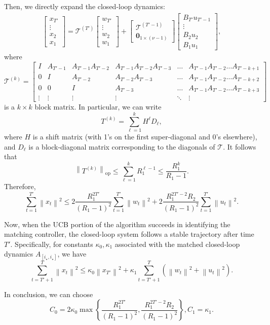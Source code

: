 \documentclass[11pt, twoside]{article}
\theoremstyle{definition}
\newcommand{\norm}[1]{\left\lVert #1 \right\rVert}
\newcommand{\tbo}[2]{\begin{bmatrix}#1 \\ #2\end{bmatrix}}
\newcommand{\opnorm}[1]{\norm{#1}_{\mathrm{op}}}
\begin{document}
Then, we directly expand the closed-loop dynamics:
\begin{align*}
\begin{bmatrix} x_{T'} \\ \vdots \\x_2 \\ x_1 \end{bmatrix}
=
\mathcal{T}^{(T')}
\begin{bmatrix} w_{T'} \\ \vdots \\w_2 \\ w_1  \end{bmatrix}
+
\tbo{\mathcal{T}^{(T'-1)}}{\mathbf{0}_{1 \times (\nu-1)}}
\begin{bmatrix} B_{T'} u_{T'-1} \\ \vdots \\ B_2 u_2 \\ B_1 u_1  \end{bmatrix},
\end{align*}
where
$$\mathcal{T}^{(k)} = 
\begin{bmatrix} 
    I & A_{T'-1} & A_{T'-1}A_{T'-2} & A_{T'-1}A_{T'-2}A_{T'-3} & \dots &A_{T'-1}A_{T'-2} \dots A_{T'-k+1}\\ 
    0 & I & A_{T'-2} & A_{T'-2}A_{T'-3} & \dots & A_{T'-1}A_{T'-2} \dots A_{T'-k+2} \\ 
    0 & 0 & I & A_{T'-3} & \dots & A_{T'-1}A_{T'-2} \dots A_{T'-k+3}\\ 
    \vdots & \vdots & \vdots & \vdots & \ddots & \vdots
\end{bmatrix}$$
is a $k \times k$ block matrix.
In particular, we can write
\[T^{(k)} = \sum_{\ell=1}^k H^\ell D_\ell,\]
where $H$ is a shift matrix (with 1's on the first super-diagonal and 0's elsewhere), and $D_\ell$ is a block-diagonal matrix corresponding to the diagonals of $\mathcal{T}$.
It follows that 
\[\opnorm{T^{(k)}} \le \sum_{\ell=1}^k R_1^{\ell-1} \le \frac{R_1^{k}}{R_1 -1}.\]
Therefore,
\[\sum_{t=1}^{T'} \norm{x_t}^2 \le 2 \frac{R_1^{2T'}}{(R_1-1)^2} \sum_{t=1}^{T'} \norm{w_t}^2 + 2 \frac{R_1^{2T'-2}R_2}{(R_1-1)^2} \sum_{t=1}^{T'} \norm{u_t}^2. \]

Now, when the UCB portion of the algorithm succeeds in identifying the matching controller, the closed-loop system follows a stable trajectory after time $T'$.
Specifically, for constants $\kappa_0, \kappa_1$ associated with the matched closed-loop dynamics $A_{[i_\star, i_\star]}$, we have
\[\sum_{t=T'+1}^{T} \norm{x_t}^2 \le \kappa_0 \norm{x_{T'}}^2 + \kappa_1 \sum_{t=T'+1}^{T} (\norm{w_t}^2 + \norm{u_t}^2).\]

In conclusion, we can choose
\[C_0 = 2 \kappa_0 \max\left\{\frac{R_1^{2T'}}{(R_1-1)^2}, \frac{R_1^{2T'-2}R_2}{(R_1-1)^2}\right\}, C_1 = \kappa_1.\] 
\end{document}

